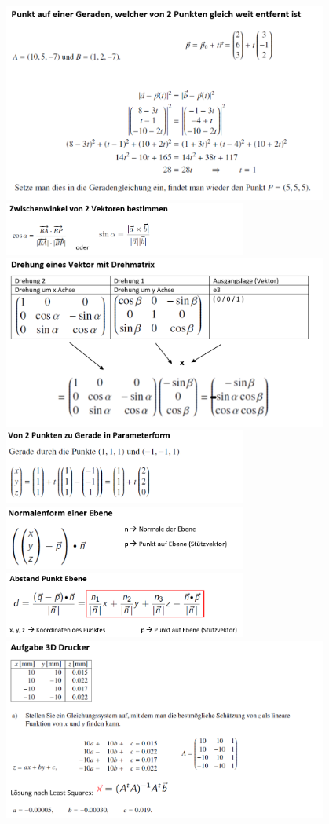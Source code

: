 \includegraphics[width=0.8\textwidth]{pics/bsp_6.png}\\
\includegraphics[width=0.6\textwidth]{pics/bsp_7.png}\\
\includegraphics[width=0.8\textwidth]{pics/bsp_8.png}\\
\includegraphics[width=0.6\textwidth]{pics/bsp_9.png}\\
\includegraphics[width=0.6\textwidth]{pics/bsp_10.png}\\
\includegraphics[width=0.6\textwidth]{pics/bsp_11.png}\\
\includegraphics[width=0.8\textwidth]{pics/bsp_12.png}
